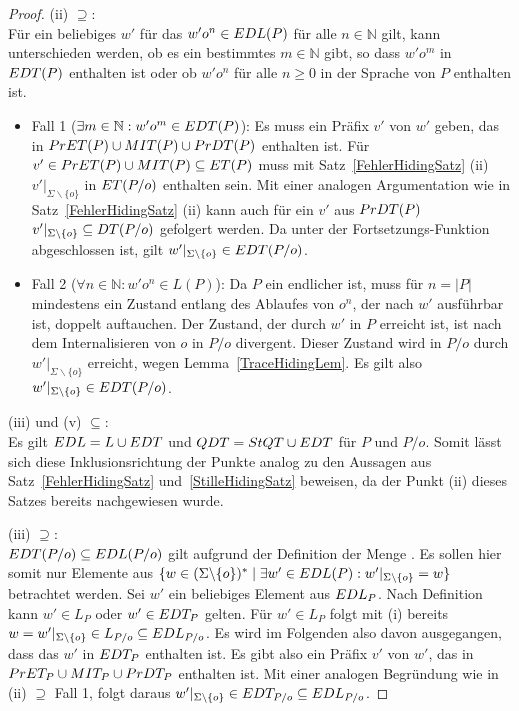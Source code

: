 \begin{proof}
  (ii)  \glqq $\supseteq$\grqq{}:\\
  Für ein beliebiges $w'$ für das $w'o^n\in EDL (P)$ für alle $n\in\mathbb{N}$
  gilt, kann unterschieden werden, ob es ein bestimmtes $m\in\mathbb{N}$ gibt,
  so dass $w'o^m$ in $EDT (P)$ enthalten ist oder ob $w'o^n$ für alle $n\geq
  0$ in der Sprache von $P$ enthalten ist.
  \begin{itemize}
    \item Fall 1 ($\exists m\in\mathbb{N}: w'o^m\in EDT (P)$): Es muss ein
      Präfix $v'$ von $w'$ geben, das in $PrET (P)\cup MIT (P)\cup PrDT (P)$
      enthalten ist. Für $v'\in PrET (P)\cup MIT (P) \subseteq ET (P)$ muss
      mit Satz~\ref{FehlerHidingSatz} (ii) $v'|_{\Sigma\backslash\{o\}}$ in
      $ET (P/o)$ enthalten sein. Mit einer analogen Argumentation wie in
      Satz~\ref{FehlerHidingSatz} (ii) kann auch für ein $v'$ aus $PrDT (P)$
      $v'|_{\Sigma\backslash\{o\}}\subseteq DT (P/o)$ gefolgert werden. Da
      \EDT{} unter der Fortsetzungs-Funktion \cont{} abgeschlossen ist, gilt
      $w'|_{\Sigma\backslash\{o\}}\in EDT (P/o)$.
    \item Fall 2 ($\forall n\in\mathbb{N}: w'o^n\in L (P)$): Da $P$ ein
      endlicher \MEIO{} ist, muss für $n = |P|$ mindestens ein Zustand entlang
      des Ablaufes von $o^n$, der nach $w'$ ausführbar ist, doppelt auftauchen.
      Der Zustand, der durch $w'$ in $P$ erreicht ist, ist nach dem
      Internalisieren von $o$ in $P/o$ divergent. Dieser Zustand wird in $P/o$
      durch $w'|_{\Sigma\backslash\{o\}}$ erreicht, wegen
      Lemma~\ref{TraceHidingLem}. Es gilt also $w'|_{\Sigma\backslash\{o\}} \in
      EDT (P/o)$.
  \end{itemize}

  (iii) und (v) \glqq $\subseteq$\grqq{}:\\
  Es gilt $EDL = L \cup EDT$ und $QDT = StQT \cup EDT$ für $P$ und $P/o$.
  Somit lässt sich diese Inklusionsrichtung der Punkte analog zu den Aussagen
  aus Satz~\ref{FehlerHidingSatz} und~\ref{StilleHidingSatz} beweisen, da der
  Punkt (ii) dieses Satzes bereits nachgewiesen wurde.

  (iii) \glqq $\supseteq$\grqq{}:\\
  $EDT (P/o)\subseteq EDL (P/o)$ gilt aufgrund der Definition der Menge
  \EDL{}. Es sollen hier somit nur Elemente aus $\{w\in (\Sigma\backslash
  \{o\})^*\mid \exists w'\in EDL(P): w'|_{\Sigma\backslash \{o\}} = w\}$
  betrachtet werden. Sei $w'$ ein beliebiges Element aus $EDL _P$. Nach
  Definition kann $w'\in L_P$ oder $w'\in EDT _P$ gelten. Für $w'\in L_P$ folgt
  mit (i) bereits $w = w'|_{\Sigma\backslash \{o\}}\in L_{P/o}\subseteq EDL
  _{P/o}$. Es wird im Folgenden also davon ausgegangen, dass das $w'$ in $EDT
  _P$ enthalten ist. Es gibt also ein Präfix $v'$ von $w'$, das in $PrET_P
  \cup MIT _P\cup PrDT _P$ enthalten ist. Mit einer analogen Begründung wie
  in (ii) \glqq $\supseteq$\grqq{} Fall 1, folgt daraus
  $w'|_{\Sigma\backslash\{o\}} \in EDT _{P/o} \subseteq EDL _{P/o}$.


\end{proof}

